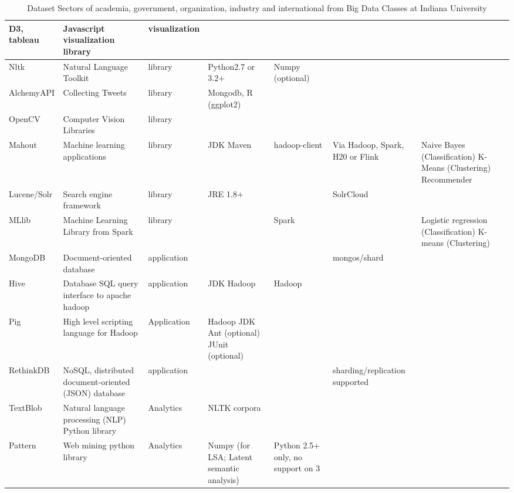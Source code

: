 \documentclass[9pt,twocolumn,twoside]{styles/osajnl}
\begin{document}
\begin{table}[htb]
\begin{center}
\begin{small}
\begin{tabular}{l|m{3cm}|l|m{2cm}|m{2cm}|m{2cm}|m{2cm}}
	D3, tableau &  Javascript visualization library & visualization & &  & &  \\ \hline
	Nltk & Natural Language Toolkit & library & Python2.7 or 3.2+ & Numpy (optional) & 	 & \\ \hline
	AlchemyAPI & Collecting Tweets & library & Mongodb, R (ggplot2) & 	 &  & \\ \hline
	OpenCV & Computer Vision Libraries & library &  & &  &  \\ \hline
	Mahout & Machine learning applications & library & JDK Maven & hadoop-client & Via Hadoop, Spark, H20 or Flink & Naive Bayes (Classification) K-Means (Clustering) Recommender \\ \hline
	Lucene/Solr & Search engine framework & library & JRE 1.8+ & 	 & SolrCloud & 	 \\ \hline
	MLlib & Machine Learning Library from Spark & library & & Spark & & Logistic regression (Classification) K-means (Clustering) \\ \hline
	MongoDB & Document-oriented database & application & & & mongos/shard & \\ \hline
	Hive & Database SQL query interface to apache hadoop & application & JDK  Hadoop & 	Hadoop &  &  \\ \hline
	Pig & High level scripting language for Hadoop & Application & 	Hadoop JDK Ant (optional) JUnit (optional) &  & & \\ \hline
	RethinkDB & NoSQL, distributed document-oriented (JSON) database & application &  & & sharding/replication supported & \\ \hline
	TextBlob & Natural language processing (NLP) Python library & 	Analytics & 	NLTK corpora & & & \\ \hline
	Pattern & Web mining python library & 	Analytics & 	Numpy (for LSA; Latent semantic analysis) & 	Python 2.5+ only, no support on 3 &  & \\ \hline




      \end{tabular}
      \caption{Dataset Sectors of academia, government, organization,
        industry and international from Big Data Classes at Indiana
        University}
      \label{tab:dataset-sector-iu}
    \end{small}
  \end{center}
\end{table}


	

	
\end{document}
